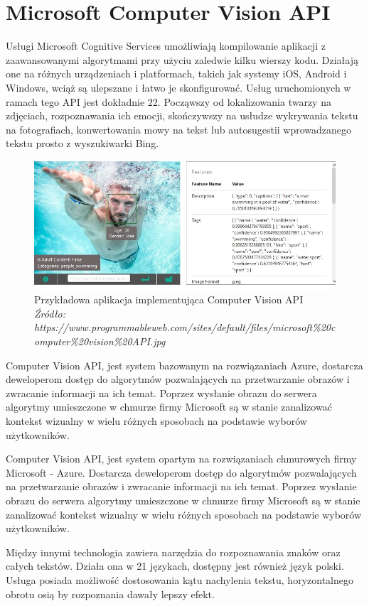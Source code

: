 \documentclass[brudnopis]{xmgr}
\begin{document}
\section{Microsoft Computer Vision API}

Usługi Microsoft Cognitive Services\cite{9} umożliwiają kompilowanie aplikacji z zaawansowanymi algorytmami przy użyciu zaledwie kilku wierszy kodu. Działają one na różnych urządzeniach i platformach, takich jak systemy iOS, Android i Windows, wciąż są ulepszane i łatwo je skonfigurować. Usług uruchomionych w ramach tego API jest dokładnie 22. Począwszy od lokalizowania twarzy na zdjęciach, rozpoznawania ich emocji, skończywszy na usłudze wykrywania tekstu na fotografiach, konwertowania mowy na tekst lub autosugestii wprowadzanego tekstu prosto z wyszukiwarki Bing.

\begin{figure}[!tbh]
\centering
\includegraphics[width=.8\hsize]{fig/mscvapi}
\caption{Przykładowa aplikacja implementująca Computer Vision API \emph{Źródło: https://www.programmableweb.com/sites/default/files/microsoft\%20computer\%20vision\%20API.jpg}}
\end{figure}
\newpage

Computer Vision API, jest system bazowanym na rozwiązaniach Azure, dostarcza deweloperom dostęp do algorytmów pozwalających na przetwarzanie obrazów i zwracanie informacji na ich temat. Poprzez wysłanie obrazu do serwera algorytmy umieszczone w chmurze firmy Microsoft są w stanie zanalizować kontekst wizualny w wielu różnych sposobach na podstawie wyborów użytkowników.

Computer Vision API, jest system opartym na rozwiązaniach chmurowych firmy Microsoft - Azure. Dostarcza deweloperom dostęp do algorytmów pozwalających na przetwarzanie obrazów i zwracanie informacji na ich temat. Poprzez wysłanie obrazu do serwera algorytmy umieszczone w chmurze firmy Microsoft są w stanie zanalizować kontekst wizualny w wielu różnych sposobach na podstawie wyborów użytkowników.

Między innymi technologia zawiera narzędzia do rozpoznawania znaków oraz całych tekstów. Działa ona w 21 językach, dostępny jest również język polski. Usługa posiada możliwość dostosowania kątu nachylenia tekstu, horyzontalnego obrotu osią by rozpoznania dawały lepszy efekt. 
\end{document}
